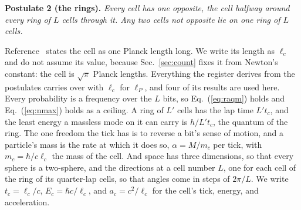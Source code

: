 \documentclass[aps,prd,twocolumn,superscriptaddress,nofootinbib,showkeys]{revtex4-2}
\newcommand{\lc}{\ell_c}
\newcommand{\tc}{t_c}
\newcommand{\mc}{m_c}
\newcommand{\Ec}{E_c}
\newcommand{\ac}{a_c}
\begin{document}
\textbf{Postulate 2 (the rings).} \emph{Every cell has one opposite, the cell halfway around every ring of $L$ cells through it. Any two cells not opposite lie on one ring of $L$ cells.}

Reference~\cite{korytko2026c} states the cell as one Planck length long. We write its length as $\lc$ and do not assume its value, because Sec.~\ref{sec:count} fixes it from Newton's constant: the cell is $\sqrt\pi$ Planck lengths. Everything the register derives from the postulates carries over with $\lc$ for $\ell_P$, and four of its results are used here. Every probability is a frequency over the $L$ bits, so Eq.~(\ref{eq:raqm}) holds and Eq.~(\ref{eq:nmax}) holds as a ceiling. A ring of $L'$ cells has the lap time $L'\tc$, and the least energy a massless mode on it can carry is $h/L'\tc$, the quantum of the ring. The one freedom the tick has is to reverse a bit's sense of motion, and a particle's mass is the rate at which it does so, $\alpha = M/\mc$ per tick, with $\mc = \hbar/c\lc$ the mass of the cell. And space has three dimensions, so that every sphere is a two-sphere, and the directions at a cell number $L$, one for each cell of the ring of its quarter-lap cells, so that angles come in steps of $2\pi/L$. We write $\tc = \lc/c$, $\Ec = \hbar c/\lc$, and $\ac = c^2/\lc$ for the cell's tick, energy, and acceleration.
\end{document}
